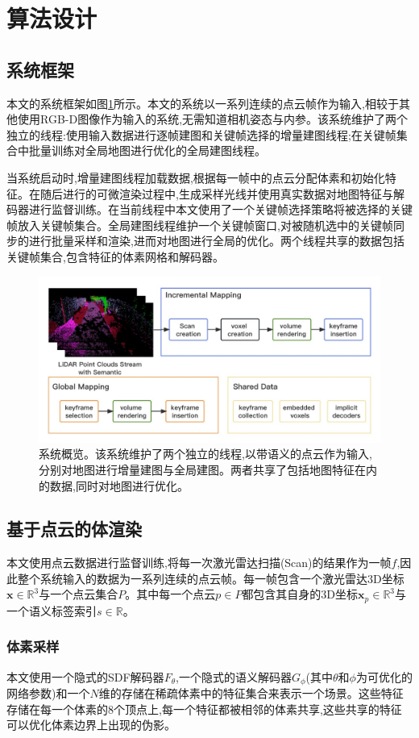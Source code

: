\section{算法设计}\label{algorithm}
\subsection{系统框架}
本文的系统框架如图\ref{system}所示。本文的系统以一系列连续的点云帧作为输入,相较于其他使用RGB-D图像作为输入的系统,无需知道相机姿态与内参。该系统维护了两个独立的线程:使用输入数据进行逐帧建图和关键帧选择的增量建图线程;在关键帧集合中批量训练对全局地图进行优化的全局建图线程。

当系统启动时,增量建图线程加载数据,根据每一帧中的点云分配体素和初始化特征。在随后进行的可微渲染过程中,生成采样光线并使用真实数据对地图特征与解码器进行监督训练。在当前线程中本文使用了一个关键帧选择策略将被选择的关键帧放入关键帧集合。全局建图线程维护一个关键帧窗口,对被随机选中的关键帧同步的进行批量采样和渲染,进而对地图进行全局的优化。两个线程共享的数据包括关键帧集合,包含特征的体素网格和解码器。
\begin{figure}[htbp]
    \includegraphics[scale = 0.355]{figures/system.jpg}
    \centering
    \caption{系统概览。该系统维护了两个独立的线程,以带语义的点云作为输入,分别对地图进行增量建图与全局建图。两者共享了包括地图特征在内的数据,同时对地图进行优化。}\label{system}
\end{figure}
\subsection{基于点云的体渲染}
本文使用点云数据进行监督训练,将每一次激光雷达扫描(Scan)的结果作为一帧$f$,因此整个系统输入的数据为一系列连续的点云帧。每一帧包含一个激光雷达3D坐标$\mathbf{x}\in \mathbb{R}^3 $与一个点云集合$P$。其中每一个点云$p\in P$都包含其自身的3D坐标$\mathbf{x}_p\in \mathbb{R}^3$与一个语义标签索引$s\in \mathbb{R}$。
\subsubsection{体素采样}
本文使用一个隐式的SDF解码器$F_\theta$,一个隐式的语义解码器$G_\phi$(其中$\theta$和$\phi$为可优化的网络参数)和一个$N$维的存储在稀疏体素中的特征集合来表示一个场景。这些特征存储在每一个体素的8个顶点上,每一个特征都被相邻的体素共享,这些共享的特征可以优化体素边界上出现的伪影。

